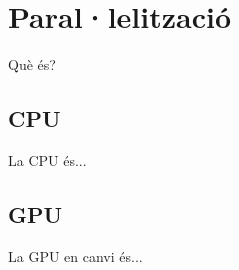 \section{Paral·lelització}
Què és?

\subsection{CPU}
La CPU és...

\subsection{GPU}
La GPU en canvi és...
